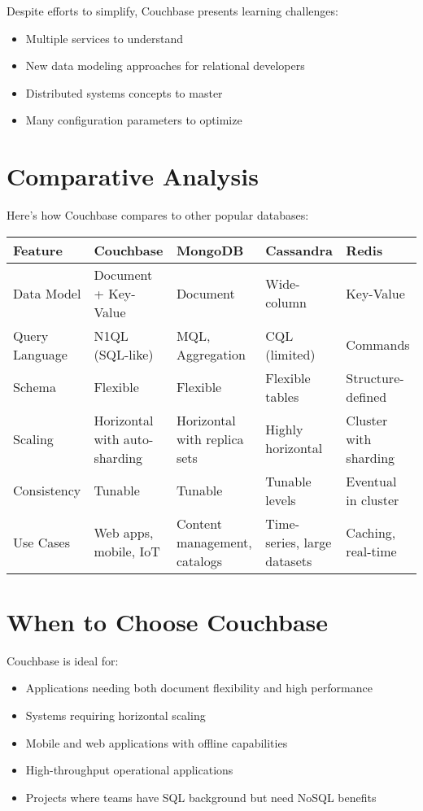 Despite efforts to simplify, Couchbase presents learning challenges:
\begin{itemize}
  \item Multiple services to understand
  \item New data modeling approaches for relational developers
  \item Distributed systems concepts to master
  \item Many configuration parameters to optimize
\end{itemize}

\section{Comparative Analysis}

Here's how Couchbase compares to other popular databases:

\begin{tabular}{|p{2cm}|p{2cm}|p{2cm}|p{2cm}|p{2cm}|}
\hline
\textbf{Feature} & \textbf{Couchbase} & \textbf{MongoDB} & \textbf{Cassandra} & \textbf{Redis} \\
\hline
Data Model & Document + Key-Value & Document & Wide-column & Key-Value \\
\hline
Query Language & N1QL (SQL-like) & MQL, Aggregation & CQL (limited) & Commands \\
\hline
Schema & Flexible & Flexible & Flexible tables & Structure-defined \\
\hline
Scaling & Horizontal with auto-sharding & Horizontal with replica sets & Highly horizontal & Cluster with sharding \\
\hline
Consistency & Tunable & Tunable & Tunable levels & Eventual in cluster \\
\hline
Use Cases & Web apps, mobile, IoT & Content management, catalogs & Time-series, large datasets & Caching, real-time \\
\hline
\end{tabular}

\section{When to Choose Couchbase}

Couchbase is ideal for:
\begin{itemize}
  \item Applications needing both document flexibility and high performance
  \item Systems requiring horizontal scaling
  \item Mobile and web applications with offline capabilities
  \item High-throughput operational applications
  \item Projects where teams have SQL background but need NoSQL benefits
\end{itemize}

